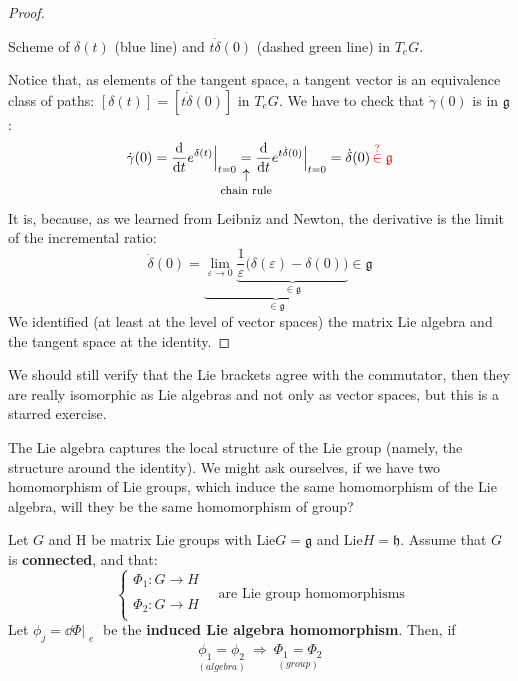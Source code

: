 \documentclass[../main.tex]{subfiles}
\begin{document}
\begin{proof}
\begin{marginfigure}[5mm]
    \caption{Scheme of $\delta(t)$ (blue line) and $t\Dot{\delta}(0)$ (dashed green line) in $T_eG$.}
\end{marginfigure} 
Notice that, as elements of the tangent space, a tangent vector is an equivalence class of paths: $[\delta(t)]=[t\Dot{\delta}(0)]$ in $T_eG$. We have to check that $\Dot{\gamma}(0)$ is in $\mathfrak{g}$:
\[
\Dot{\gamma}(0)=\dv{}{t}e^{\delta(t)}\Bigr|_{\substack{t=0}}\underset{\mathclap{\tikz \node {$\uparrow$} node [below=1ex] {\footnotesize chain rule};}}{=}\dv{}{t}e^{t\Dot{\delta}(0)}\Bigr|_{\substack{t=0}}=\Dot{\delta}(0)\,{\color{red}\stackrel{?}{\in}\mathfrak{g}} 
\]
It is, because, as we learned from Leibniz and Newton, the derivative is the limit of the incremental ratio:
\[
\Dot{\delta}(0)=\underbrace{\lim_{\varepsilon\to0}\underbrace{\frac{1}{\varepsilon}\big(\delta(\varepsilon)-\delta(0)\big)}_{\in\mathfrak{g}}}_{\in\mathfrak{g}}\in\mathfrak{g}
\]
We identified (at least at the level of vector spaces) the matrix Lie algebra and the tangent space at the identity.
\end{proof}
We should still verify that the Lie brackets agree with the commutator, then they are really isomorphic as Lie algebras and not only as vector spaces, but this is a starred exercise.

The Lie algebra captures the local structure of the Lie group (namely, the structure around the identity). We might ask ourselves, if we have two homomorphism of Lie groups, which induce the same homomorphism of the Lie algebra, will they be the same homomorphism of group?
\begin{corollary}
Let $G$ and H be matrix Lie groups with Lie$G=\mathfrak{g}$ and Lie$H=\mathfrak{h}$. Assume that $G$ is \textbf{connected}, and that:
\[
\begin{cases}
\Phi_1:G\xrightarrow[]{}H\\
\Phi_2:G\xrightarrow[]{}H
\end{cases} \quad \text{are Lie group homomorphisms}
\]
Let $\phi_j=\dd\Phi\Bigr|_{\substack{e}}$ be the \textbf{induced Lie algebra homomorphism}. Then, if
\[
\underset{(algebra)}{\phi_1=\phi_2}\ \Rightarrow\ \underset{(group)}{\Phi_1=\Phi_2}
\]
\end{corollary}
\end{document}
